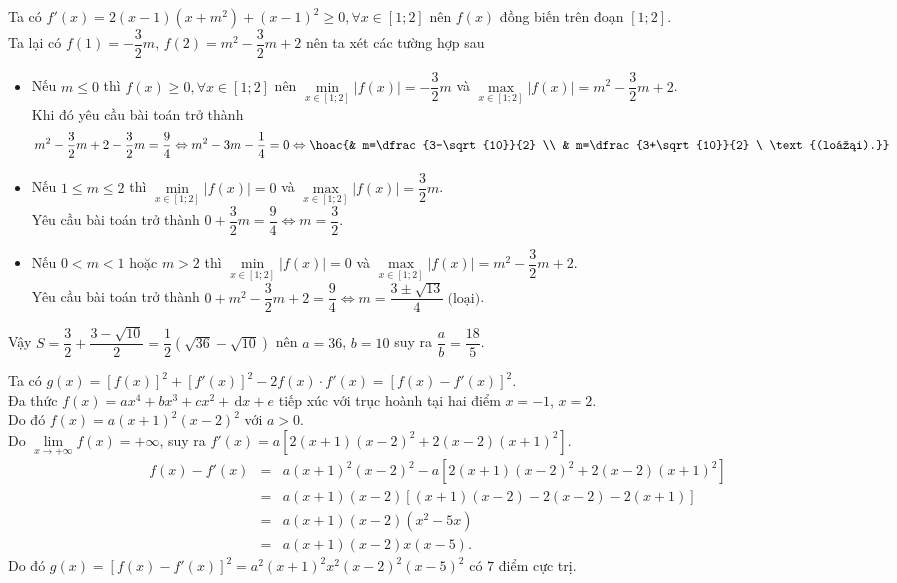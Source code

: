 \begin{Solbook}{20}
 \par \noindent  Ta có $f'(x)=2(x-1)(x+m^2)+(x-1)^2\ge 0, \forall x\in [1;2]$ nên $f(x)$ đồng biến trên đoạn $[1;2]$.\\ Ta lại có $f(1)=-\dfrac {3}{2}m$, $f(2)=m^2-\dfrac {3}{2}m+2$ nên ta xét các tường hợp sau \begin {itemize} \item Nếu $m\le 0$ thì $f(x)\ge 0, \forall x\in [1;2]$ nên $\min \limits _{x \in [1;2]} |f(x)|=-\dfrac {3}{2}m$ và $\max \limits _{x \in [1;2]} |f(x)|=m^2-\dfrac {3}{2}m+2$.\\ Khi đó yêu cầu bài toán trở thành $$m^2-\dfrac {3}{2}m+2-\dfrac {3}{2}m=\dfrac {9}{4}\Leftrightarrow m^2-3m-\dfrac {1}{4}=0\Leftrightarrow \hoac {& m=\dfrac {3-\sqrt {10}}{2} \\ & m=\dfrac {3+\sqrt {10}}{2} \ \text {(loại).}}$$ \item Nếu $1\le m\le 2$ thì $\min \limits _{x \in [1;2]} |f(x)|=0$ và $\max \limits _{x \in [1;2]} |f(x)|=\dfrac {3}{2}m$. \\ Yêu cầu bài toán trở thành $0+\dfrac {3}{2}m=\dfrac {9}{4}\Leftrightarrow m=\dfrac {3}{2}$. \item Nếu $0<m<1$ hoặc $m>2$ thì $\min \limits _{x \in [1;2]} |f(x)|=0$ và $\max \limits _{x \in [1;2]} |f(x)|=m^2-\dfrac {3}{2}m+2$.\\ Yêu cầu bài toán trở thành $0+m^2-\dfrac {3}{2}m+2=\dfrac {9}{4}\Leftrightarrow m=\dfrac {3\pm \sqrt {13}}{4} \ \text {(loại)}$. \end {itemize} Vậy $S=\dfrac {3}{2}+\dfrac {3-\sqrt {10}}{2}=\dfrac {1}{2}\left ( \sqrt {36}-\sqrt {10}\right ) $ nên $a=36$, $b=10$ suy ra $\dfrac {a}{b}=\dfrac {18}{5}$.  \par \noindent \selectD \hfill \qedEX 
\end{Solbook}
\begin{Solbook}{21}
 \par \noindent  Ta có $g(x)=\left [f(x)\right ]^2+\left [f'(x)\right ]^2-2f(x) \cdot f'(x)=\left [f(x)-f'(x)\right ]^2$.\\ Đa thức $f(x)=ax^4+bx^3+cx^2+\mathrm {\,d}x+e$ tiếp xúc với trục hoành tại hai điểm $x=-1$, $x=2$.\\ Do đó $f(x)=a(x+1)^2(x-2)^2$ với $a>0$.\\ Do $\lim \limits _{x\to +\infty } f(x)=+\infty $, suy ra $f'(x)=a\left [2(x+1)(x-2)^2+2(x-2)(x+1)^2\right ]$. {\allowdisplaybreaks \begin {eqnarray*} f(x)-f'(x)&=&a(x+1)^2(x-2)^2-a \left [2(x+1)(x-2)^2+2(x-2)(x+1)^2\right ]\\ &=& a(x+1)(x-2)\left [(x+1)(x-2)-2(x-2)-2(x+1)\right ]\\ &=& a(x+1)(x-2)\left (x^2-5x\right )\\ &=& a(x+1)(x-2)x(x-5). \end {eqnarray*} } Do đó $g(x)=\left [f(x)-f'(x)\right ]^2=a^2(x+1)^2x^2(x-2)^2(x-5)^2$ có $7$ điểm cực trị. \par \noindent \selectC \hfill \qedEX 
\end{Solbook}
